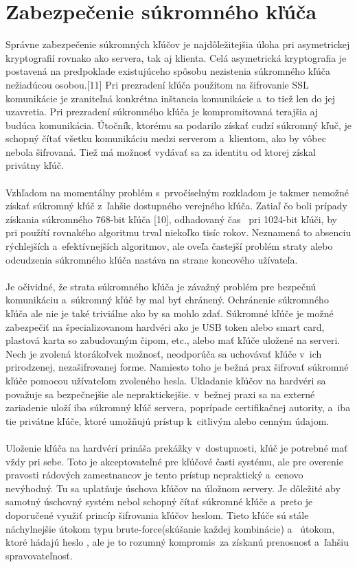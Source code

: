 \documentclass[
  digital, %
  table,   %
oneside,
  nolof,     %
  nolot,     %
]{fithesis3}
\begin{document}
\section{Zabezpečenie súkromného kľúča }
Správne zabezpečenie súkromných kľúčov je najdôležitejšia úloha pri asymetrickej kryptografií rovnako ako servera, tak aj klienta. Celá asymetrická kryptografia je postavená na predpoklade existujúceho spôsobu nezistenia súkromného kľúča nežiadúcou osobou.[11] Pri prezradení kľúča použitom na šifrovanie SSL komunikácie je zraniteľná konkrétna inštancia komunikácie a~to tiež len do jej uzavretia. Pri prezradení súkromného kľúča je kompromitovaná terajšia aj budúca komunikácia. Útočník, ktorému sa podarilo získať cudzí súkromný kľuč, je schopný čítať všetku komunikáciu medzi serverom a~klientom, ako by vôbec nebola šifrovaná. Tiež má možnosť vydávať sa za identitu od ktorej získal privátny kľúč.\paragraph{}
Vzhľadom na momentálny problém s~prvočíselným rozkladom je takmer nemožné získať súkromný kľúč z~ľahšie dostupného verejného kľúča. Zatiaľ čo boli prípady získania súkromného 768-bit kľúča [10], odhadovaný čas~ pri 1024-bit kľúči, by pri  použítí rovnakého algoritmu trval niekoľko tisíc rokov. Neznamená to absenciu rýchlejších a~efektívnejších algoritmov, ale oveľa častejší problém straty alebo odcudzenia súkromného kľúča nastáva na strane koncového užívateľa.\paragraph{}
Je očividné, že strata súkromného kľúča je závažný problém pre bezpečnú komunikáciu a~súkromný kľúč by mal byť chránený. Ochránenie súkromného kľúča ale nie je také triviálne ako by sa mohlo zdať. Súkromné kľúče je možné zabezpečiť na špecializovanom hardvéri ako je USB token alebo smart card, plastová karta so zabudovaným čipom, etc., alebo mať kľúče uložené na serveri. Nech je zvolená ktorákoľvek možnosť, neodporúča sa  uchovávať kľúče v~ich prirodzenej, nezašifrovanej forme. Namiesto toho je bežná prax šifrovať súkromné kľúče pomocou užívateľom zvoleného hesla. Ukladanie kľúčov na hardvéri sa považuje sa bezpečnejšie ale nepraktickejšie. v~bežnej praxi sa na externé zariadenie uloží iba súkromný kľúč servera, poprípade certifikačnej autority, a~iba tie privátne kľúče, ktoré umožňujú prístup k~citlivým alebo cenným údajom. \paragraph{}
Uloženie kľúča na hardvéri prináša prekážky v~dostupnosti, kľúč je potrebné mať vždy pri sebe. Toto je akceptovateľné pre kľúčové časti systému, ale pre overenie pravosti rádových zamestnancov je tento prístup nepraktický a~cenovo nevýhodný. Tu sa uplatňuje úschova kľúčov na úložnom servery. Je dôležité aby samotný úschovný systém nebol schopný čítať súkromné kľúče a~preto je doporučené využiť princíp šifrovania kľúčov heslom. Tieto kľúče sú stále náchylnejšie útokom typu brute-force(skúšanie každej kombinácie) a~ útokom, ktoré hádajú heslo , ale je to rozumný kompromis~za získanú prenosnosť a~ľahšiu spravovateľnosť.
 
\end{document}
